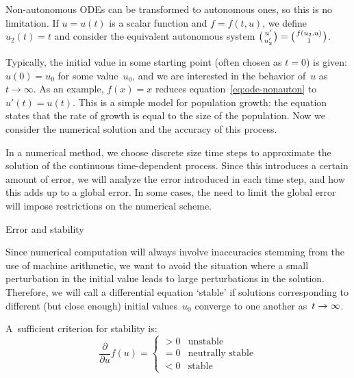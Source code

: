 \begin{remark}
Non-autonomous \ac{ODE}s can be transformed to autonomous
  ones, so this is no limitation. If $u=u(t)$ is a scalar function and
  $f=f(t,u)$, we define $u_2(t)=t$ and consider the equivalent
  autonomous system
  $\big({u'\atop u'_2}\bigr)=\bigl({f(u_2,u)\atop 1}\bigr)$.
\end{remark}

Typically, the initial value in some starting point (often
chosen as $t=0$) is given: $u(0)=u_0$ for some value~$u_0$, and we are
interested in the behavior of~$u$ as $t\rightarrow\infty$.
As an example, $f(x)=x$
reduces equation~\eqref{eq:ode-nonauton} to $u'(t)=u(t)$.
This is a
simple model for population growth: the equation states that the rate
of growth is equal to the size of the population.
Now we
consider the numerical solution and the accuracy of this process.

In a numerical method, we choose discrete size time steps to
approximate the solution of the continuous time-dependent
process. Since this introduces a certain amount of error, we will
analyze the error introduced in each time step, and how this adds up
to a global error. In some cases, the need to limit the global error
will impose restrictions on the numerical scheme.

 {Error and stability}

Since numerical computation will always involve inaccuracies
stemming from the use of machine arithmetic, we want to avoid the
situation where a small perturbation in the initial value leads to
large perturbations in the solution. Therefore, we
will call a
differential equation `stable' if solutions corresponding to different
(but close enough)
initial values~$u_0$ converge to one another
as~$t\rightarrow\nobreak\infty$. 

\begin{theorem}
  A~sufficient criterion for stability is:
  \begin{equation}
    \frac\partial{\partial u}f(u)=
  \begin{cases}
    >0&\mbox{unstable}\\ =0&\mbox{neutrally stable}\\ <0&\mbox{stable}
  \end{cases}
  \end{equation}
\end{theorem}

